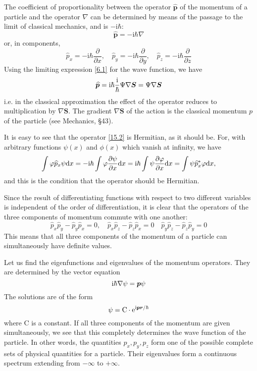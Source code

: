 The coefficient of proportionality between the operator $ \hat{\bm{p}} $ of the momentum of a particle and the operator $\nabla$ can be determined by means of the passage to the limit of classical mechanics, and is $ -\mathrm{i}\hbar $:
\begin{equation}\label{15.2}
\hat{\bm{p}}=-\mathrm{i}\hbar\nabla
\end{equation}
or, in components,
\[ \hat{p}_x=-\mathrm{i}\hbar\frac{\partial}{\partial x},\quad\hat{p}_y=-\mathrm{i}\hbar\frac{\partial}{\partial y},\quad\hat{p}_z=-\mathrm{i}\hbar\frac{\partial}{\partial z} \]
Using the limiting expression \eqref{6.1} for the wave function, we have
\[ \widehat{\bm{p}}=\mathrm{i}\hbar\frac{\mathrm{i}}{\hbar}\Psi\nabla\bm{S}=\Psi\nabla\bm{S} \]
i.e. in the classical approximation the effect of the operator reduces to multiplication by $ \nabla\bm{S} $. The gradient $ \nabla\bm{S} $ of the action is the classical momentum $ p $ of the particle (see Mechanics, \S43).

It is easy to see that the operator \eqref{15.2} is Hermitian, as it should be. For, with arbitrary functions $ \psi(x) $ and $ \phi(x) $ which vanish at infinity, we have
\[ \int\varphi\widehat{p}_x\psi\mathrm{d} x=-\mathrm{i}\hbar\int\varphi\frac{\partial\psi}{\partial x}\mathrm{d} x=\mathrm{i}\hbar\int\psi\frac{\partial \varphi}{\partial x}\mathrm{d} x=\int\psi\widehat{p}_x^*\varphi\mathrm{d} x, \]
and this is the condition that the operator should be Hermitian.

Since the result of differentiating functions with respect to two different variables is independent of the order of differentiation, it is clear that the operators of the three components of momentum commute with one another:
\begin{equation}\label{15.3}
\hat{p}_x\hat{p}_y-\hat{p}_y\hat{p}_x=0,\quad\hat{p}_x\hat{p}_z-\hat{p}_z\hat{p}_x=0\quad\hat{p}_y\hat{p}_z-\hat{p}_z\hat{p}_y=0
\end{equation}
This means that all three components of the momentum of a particle can simultaneously have definite values.

Let us find the eigenfunctions and eigenvalues of the momentum operators. They are determined by the vector equation
\begin{equation}\label{15.4}
\mathrm{i}\hbar\nabla\psi=\bm{p}\psi
\end{equation}
The solutions are of the form
\begin{equation}\label{15.5}
\psi=\mathrm{C}\cdot\mathrm{e}^{\mathrm{i} \bm{p}\bm{r}/\hbar}
\end{equation}
where $ \mathrm{C} $ is a constant. If all three components of the momentum are given simultaneously, we see that this completely determines the wave function of the particle. In other words, the quantities $ p_x,p_y,p_z $ form one of the possible complete sets of physical quantities for a particle. Their eigenvalues form a continuous spectrum extending from $ -\infty $ to $ +\infty $.

